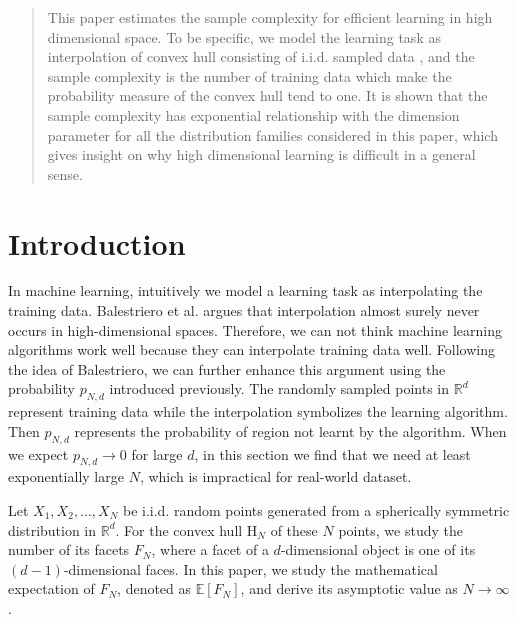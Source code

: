 \documentclass[conference,a4paper]{IEEEtran}
\def\E{\mathbb{E}}
\def\R{\mathbb{R}}
\begin{document}
\maketitle

\begin{abstract}
  This paper estimates the sample complexity for efficient learning in high dimensional space.
  To be specific, we model the learning task as interpolation of convex hull consisting of i.i.d. sampled data
  , and the sample complexity is the number of training data which make the probability measure of the convex hull
  tend to one. It is shown that the sample complexity has exponential relationship with the dimension parameter for all the distribution families
  considered in this paper, which gives insight on why high dimensional learning is difficult in a general sense. 
\end{abstract}


\section{Introduction}
\label{sec:intro}
In machine learning, intuitively we model a learning task as interpolating the
training data.
Balestriero et al. \cite{balestriero2021learning}
argues that interpolation almost surely never occurs in high-dimensional spaces.
Therefore, we can not think machine learning algorithms work well because they can interpolate training data
well.
Following the idea of Balestriero, we can further enhance this argument using the probability $p_{N,d}$ introduced previously.
The randomly sampled points in $\R^d$ represent training data
while the interpolation
symbolizes the learning algorithm. Then $p_{N,d}$ represents
the probability of region not learnt by the algorithm.
When we expect $p_{N,d} \to 0$ for large $d$,
in this section
we find that we need
at least exponentially large $N$,
which is impractical for real-world dataset.


Let $X_1, X_2, \dots, X_N$ be i.i.d. random points generated from
a spherically symmetric distribution in $\mathbb{R}^d$.
For the convex hull $\mathrm{H}_N$ of these $N$ points, we study the number of its facets $F_N$,
where a facet of a $d$-dimensional object is one of its $(d-1)$-dimensional faces.
In this paper, we study the mathematical expectation
of $F_N$, denoted as $\E[F_N]$, and derive its asymptotic value as $N\to \infty$.
\end{document}
